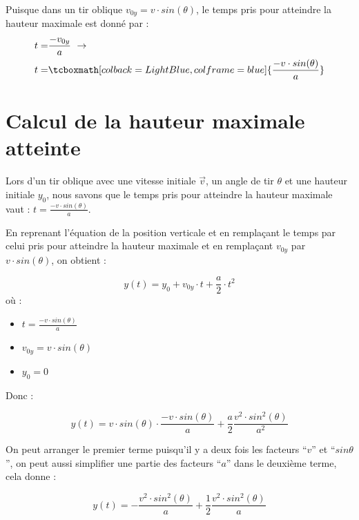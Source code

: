 Puisque dans un tir oblique \(v_{0y}=v \cdot sin(\theta)\), le temps pris pour atteindre la hauteur maximale est donné par :
\begin{align}
    t = & \frac{-v_{0y}}{a} \ \rightarrow                                             \\
    t = & \tcboxmath[colback=LightBlue,colframe=blue]{\frac{-v \cdot sin(\theta)}{a}}
\end{align}

\newpage

\section{Calcul de la hauteur maximale atteinte}
Lors d'un tir oblique avec une vitesse initiale \(\vec{v}\), un angle de tir \(\theta\) et une hauteur initiale \(y_0\), nous savons que le temps pris pour atteindre la hauteur maximale vaut : \(t=\frac{-v \cdot sin(\theta)}{a}\).

En reprenant l'équation de la position verticale et en remplaçant le temps par celui pris pour atteindre la hauteur maximale et en remplaçant \(v_{0y}\) par \(v \cdot sin(\theta)\), on obtient :

\begin{equation}
    y(t)=y_0 + v_{0y} \cdot t + \frac{a}{2} \cdot t^2
\end{equation} où :

\begin{itemize}[label=\textbullet]
    \item \(t=\frac{-v \cdot sin(\theta)}{a}\)
    \item \(v_{0y}=v \cdot sin(\theta)\)
    \item \(y_0=0\)
\end{itemize}

Donc :

\begin{equation}
    y(t)=v \cdot sin(\theta) \cdot \frac{-v \cdot sin(\theta)}{a} + \frac{a}{2} \frac{v^2 \cdot sin^2(\theta)}{a^2}
\end{equation}

On peut arranger le premier terme puisqu'il y a deux fois les facteurs \enquote{\(v\)} et \enquote{\(sin \theta\)}, on peut aussi simplifier une partie des facteurs \enquote{\(a\)} dans le deuxième terme, cela donne :

\begin{equation}
    y(t)=- \frac{v^2 \cdot sin^2(\theta)}{a} + \frac{1}{2} \frac{v^2 \cdot sin^2(\theta)}{a}
\end{equation}

